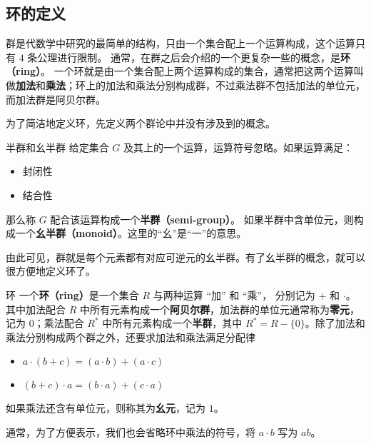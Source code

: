 


\subsection{环的定义}
群是代数学中研究的最简单的结构，只由一个集合配上一个运算构成，这个运算只有 $4$ 条公理进行限制。 通常，在群之后会介绍的一个更复杂一些的概念，是\textbf{环（ring）}。 一个环就是由一个集合配上两个运算构成的集合，通常把这两个运算叫做\textbf{加法}和\textbf{乘法}；环上的加法和乘法分别构成群，不过乘法群不包括加法的单位元，而加法群是阿贝尔群。

为了简洁地定义环，先定义两个群论中并没有涉及到的概念。

\begin{definition}{半群和幺半群}\label{Ring_def1}
给定集合 $G$ 及其上的一个运算，运算符号忽略。如果运算满足：
\begin{itemize}
\item 封闭性
\item 结合性
\end{itemize}
那么称 $G$ 配合该运算构成一个\textbf{半群（semi-group）}。
如果半群中含单位元，则构成一个\textbf{幺半群（monoid）}。这里的“幺”是“一”的意思。
\end{definition}

由此可见，群就是每个元素都有对应可逆元的幺半群。有了幺半群的概念，就可以很方便地定义环了。

\begin{definition}{环}\label{Ring_def2}
一个\textbf{环（ring）}是一个集合 $R$ 与两种运算 “加” 和 “乘”， 分别记为 $+$ 和 $\cdot$。 其中加法配合 $R$ 中所有元素构成一个\textbf{阿贝尔群}，加法群的单位元通常称为\textbf{零元}，记为 $0$；乘法配合 $R^*$ 中所有元素构成一个\textbf{半群}，其中 $R^*=R-\{0\}$。除了加法和乘法分别构成两个群之外，还要求加法和乘法满足分配律
\begin{itemize}
\item $a \cdot (b + c) = (a \cdot b) + (a \cdot c)$
\item $(b + c) \cdot a = (b \cdot a) + (c \cdot a)$
\end{itemize}
如果乘法还含有单位元，则称其为\textbf{幺元}，记为 $1$。
\end{definition}

通常，为了方便表示，我们也会省略环中乘法的符号，将 $a\cdot b$ 写为 $ab$。

